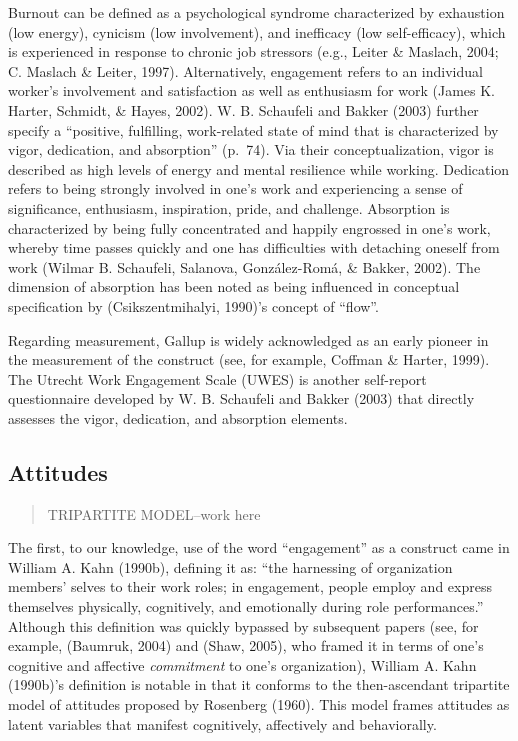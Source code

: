 \documentclass[
  man]{apa6}
\begin{document}
Burnout can be defined as a psychological syndrome characterized by exhaustion (low energy), cynicism (low involvement), and inefficacy (low self-efficacy), which is experienced in response to chronic job stressors (e.g., Leiter \& Maslach, 2004; C. Maslach \& Leiter, 1997). Alternatively, engagement refers to an individual worker's involvement and satisfaction as well as enthusiasm for work (James K. Harter, Schmidt, \& Hayes, 2002). W. B. Schaufeli and Bakker (2003) further specify a ``positive, fulfilling, work-related state of mind that is characterized by vigor, dedication, and absorption'' (p.~74). Via their conceptualization, vigor is described as high levels of energy and mental resilience while working. Dedication refers to being strongly involved in one's work and experiencing a sense of significance, enthusiasm, inspiration, pride, and challenge. Absorption is characterized by being fully concentrated and happily engrossed in one's work, whereby time passes quickly and one has difficulties with detaching oneself from work (Wilmar B. Schaufeli, Salanova, González-Romá, \& Bakker, 2002). The dimension of absorption has been noted as being influenced in conceptual specification by (Csikszentmihalyi, 1990)'s concept of ``flow''.

Regarding measurement, Gallup is widely acknowledged as an early pioneer in the measurement of the construct (see, for example, Coffman \& Harter, 1999). The Utrecht Work Engagement Scale (UWES) is another self-report questionnaire developed by W. B. Schaufeli and Bakker (2003) that directly assesses the vigor, dedication, and absorption elements.

\hypertarget{attitudes}{%
\subsection{Attitudes}\label{attitudes}}

\begin{quote}
TRIPARTITE MODEL--work here
\end{quote}

The first, to our knowledge, use of the word ``engagement'' as a construct came in William A. Kahn (1990b), defining it as: ``the harnessing of organization members' selves to their work roles; in engagement, people employ and express themselves physically, cognitively, and emotionally during role performances.'' Although this definition was quickly bypassed by subsequent papers (see, for example, (Baumruk, 2004) and (Shaw, 2005), who framed it in terms of one's cognitive and affective \emph{commitment} to one's organization), William A. Kahn (1990b)'s definition is notable in that it conforms to the then-ascendant tripartite model of attitudes proposed by Rosenberg (1960). This model frames attitudes as latent variables that manifest cognitively, affectively and behaviorally.
\end{document}
